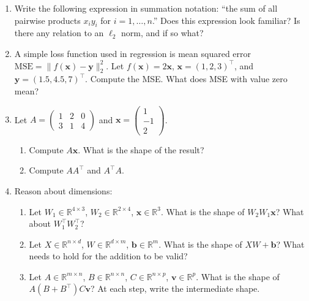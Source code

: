 \documentclass[12pt, a4paper]{scrartcl}
\begin{document}
\begin{enumerate}

    \item Write the following expression in summation notation: ``the sum of all
    pairwise products $x_i y_i$ for $i = 1, \ldots, n$.'' Does this expression
    look familiar? Is there any relation to an $\ell_2$ norm, and if so what?

    \item A simple loss function used in regression is mean squared error
    $\mathrm{MSE} = \|f(\mathbf{x}) - \mathbf{y}\|_2^2$. Let $f(\mathbf{x}) =
    2\mathbf{x}$, $\mathbf{x} = (1, 2, 3)^\top$, and $\mathbf{y} = (1.5, 4.5,
    7)^\top$. Compute the MSE. What does MSE with value zero mean?

\item Let $A = \begin{pmatrix} 1 & 2 & 0 \\ 3 & 1 & 4 \end{pmatrix}$ and
$\mathbf{x} = \begin{pmatrix} 1 \\ -1 \\ 2 \end{pmatrix}$.

\begin{enumerate}

    \item Compute $A\mathbf{x}$. What is the shape of the result?

    \item Compute $AA^\top$ and $A^\top A$.

\end{enumerate}

\item Reason about dimensions:

\begin{enumerate}

    \item Let $W_1 \in \mathbb{R}^{4 \times 3}$, $W_2 \in \mathbb{R}^{2 \times
    4}$, $\mathbf{x} \in \mathbb{R}^3$. What is the shape of $W_2 W_1
    \mathbf{x}$? What about $W_1^\top W_2^\top$?

    \item Let $X \in \mathbb{R}^{n \times d}$, $W \in \mathbb{R}^{d \times m}$,
    $\mathbf{b} \in \mathbb{R}^m$. What is the shape of $XW + \mathbf{b}$?
    What needs to hold for the addition to be valid?

    \item Let $A \in \mathbb{R}^{m \times n}$, $B \in \mathbb{R}^{n \times n}$,
    $C \in \mathbb{R}^{n \times p}$, $\mathbf{v} \in \mathbb{R}^p$. What is
    the shape of $A(B + B^\top)C\mathbf{v}$? At each step, write the
    intermediate shape.

\end{enumerate}

\end{enumerate}
\end{document}
